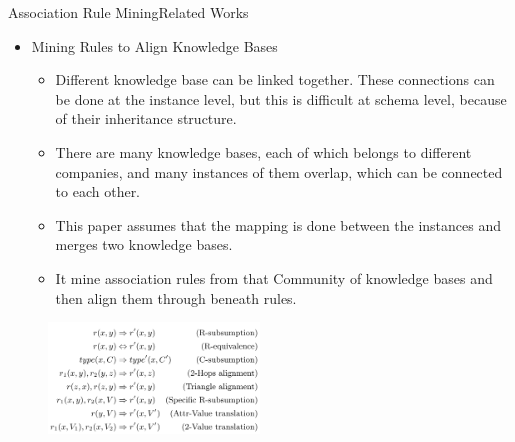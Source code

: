 \documentclass[10pt]{beamer}
\begin{document}
\begin{frame}{Association Rule Mining}{Related Works}
\begin{itemize}
\item Mining Rules to Align Knowledge Bases \cite{galarraga2013mining}
\begin{itemize}
\item Different knowledge base can be linked together. These connections can be done at the instance level, but this is difficult at schema level, because of their inheritance structure.
\item There are many knowledge bases, each of which belongs to different companies, and many instances of them overlap, which can be connected to each other.
\item This paper assumes that the mapping is done between the instances and merges two knowledge bases.
\item It mine association rules from that Community of knowledge bases and then align them through beneath rules.
\end{itemize}
\end{itemize}

\begin{figure}[H]
	\centering
	\includegraphics[width=0.5\textwidth]{images/Rosa.PNG}
	\label{fig:Rosa}
\end{figure}
\end{frame}
\end{document}
